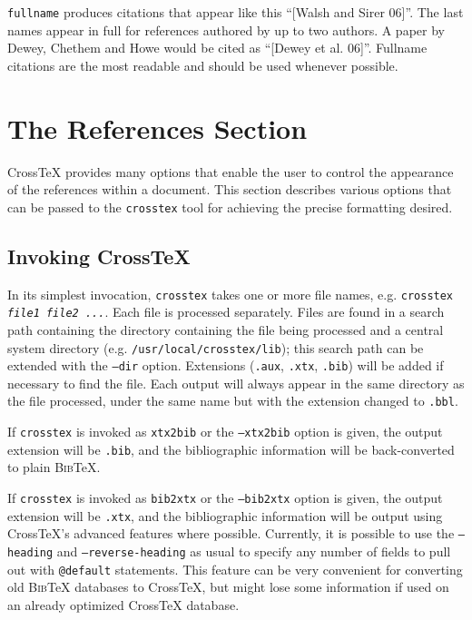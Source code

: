 \documentclass{article}
\newcommand{\XTX}{Cross\TeX}
\newcommand{\BibTeX}{\textsc{Bib}\TeX}
\begin{document}
\texttt{fullname} produces citations that appear like this ``[Walsh and
Sirer 06]''. The last names appear in full for references authored by
up to two authors. A paper by Dewey, Chethem and Howe would be cited as
``[Dewey et al. 06]''.  Fullname citations are the most readable and
should be used whenever possible.

\section{The References Section\label{sec:references}}

\XTX{} provides many options that enable the user to control the
appearance of the references within a document. This section describes
various options that can be passed to the \texttt{crosstex} tool for
achieving the precise formatting desired.

\subsection{Invoking \XTX{}}

In its simplest invocation, \texttt{crosstex} takes one or more file
names, e.g. \texttt{crosstex \textrm{\textit{file1 file2 ...}}}. Each
file is processed separately. Files are found in a search path containing
the directory containing the file being processed and a central system
directory (e.g. \texttt{/usr/local/crosstex/lib}); this search path can
be extended with the \texttt{--dir} option. Extensions (\texttt{.aux},
\texttt{.xtx}, \texttt{.bib}) will be added if necessary to find the
file. Each output will always appear in the same directory as the
file processed, under the same name but with the extension changed to
\texttt{.bbl}.

If \texttt{crosstex} is invoked as \texttt{xtx2bib} or the
\texttt{--xtx2bib} option is given, the output extension will be
\texttt{.bib}, and the bibliographic information will be back-converted
to plain \BibTeX{}.

If \texttt{crosstex} is invoked as \texttt{bib2xtx} or the
\texttt{--bib2xtx} option is given, the output extension will be
\texttt{.xtx}, and the bibliographic information will be output using
\XTX{}'s advanced features where possible.  Currently, it is possible
to use the \texttt{--heading} and \texttt{--reverse-heading} as usual
to specify any number of fields to pull out with \texttt{@default}
statements.  This feature can be very convenient for converting old
\BibTeX{} databases to \XTX{}, but might lose some information if used
on an already optimized \XTX{} database.
\end{document}
